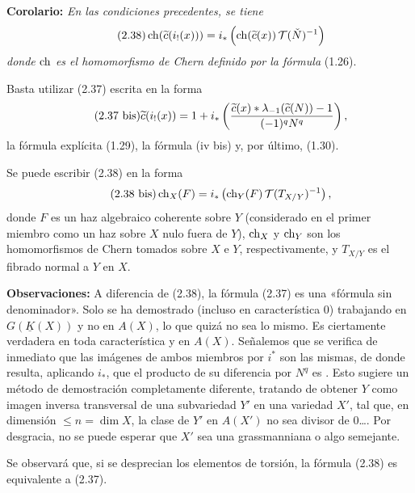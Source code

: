 \textbf{Corolario:} \emph{En las condiciones precedentes, se tiene}
\begin{equation}\tag{2.38}
 \ch(\widetilde c(i_!(x)))=i_*\left(\ch(\widetilde c(x))\,\mathcal T(\check N)^{-1}\right)
\end{equation}
\emph{donde $\ch$ es el homomorfismo de Chern definido por la fórmula} (1.26).

Basta utilizar (2.37) escrita en la forma
\begin{equation}\tag{2.37 bis}
 \widetilde c(i_!(x))=1+i_*\left(\frac{\widetilde c(x)*\lambda_{-1}(\sisi{c(N)}{\widetilde c(N)})-1}{(-1)^qN^q}\right),
\end{equation}
la fórmula explícita (1.29), la fórmula (iv bis) y, por último, (1.30).

Se puede escribir (2.38) en la forma
\begin{equation}\tag{2.38 bis}
 \ch_X(F)=i_*\left(\ch_Y(F)\,\mathcal T(T_{X/Y})^{-1}\right),
\end{equation}
donde $F$ es un haz algebraico coherente sobre $Y$ (considerado en el primer miembro como un haz sobre $X$ nulo fuera de $Y$), $\ch_X$ y $\ch_Y$ son los homomorfismos de Chern tomados sobre $X$ e $Y$, respectivamente, y $T_{X/Y}$ es el fibrado normal a $Y$ en $X$.

\textbf{Observaciones:} A diferencia de (2.38), la fórmula (2.37) es una «fórmula sin denominador». Solo se ha demostrado (incluso en característica $0$) trabajando en $G(\underline K(X))$ y no en $A(X)$, lo que quizá no sea lo mismo. Es ciertamente verdadera en toda característica y en $A(X)$. Señalemos que se verifica de inmediato que las imágenes de ambos miembros por $i^*$ son las mismas, de donde resulta, aplicando $i_*$, que el producto de su diferencia por $N^q$ es . Esto sugiere un método de demostración completamente diferente, tratando de obtener $Y$ como imagen inversa transversal de una subvariedad $Y'$ en una variedad $X'$, tal que, en dimensión $\leq n=\dim X$, la clase de $Y'$ en $A(X')$ no sea divisor de $0$\dots. Por desgracia, no se puede esperar que $X'$ sea una grassmanniana o algo semejante.

Se observará que, si se desprecian los elementos de torsión, la fórmula (2.38) es equivalente a (2.37).




\providecommand{\cS}{\mathcal S}
\providecommand{\cD}{\mathcal D}
\providecommand{\cE}{\mathscr E}
\providecommand{\cG}{\mathscr G}
\providecommand{\cL}{\mathscr L}
\providecommand{\cM}{\mathscr M}
\providecommand{\cP}{\mathscr P}
\providecommand{\cK}{\mathcal K}
\providecommand{\Db}{\mathrm D}
\providecommand{\Kb}{\mathrm K}
\providecommand{\Trc}{\operatorname{Tr}}
\providecommand{\ob}{\operatorname{ob}}
\providecommand{\Coh}{\operatorname{Coh}}
\providecommand{\Cone}{\operatorname{Cone}}
\providecommand{\im}{\operatorname{Im}}
\providecommand{\Id}{\operatorname{Id}}
\providecommand{\RR}{\mathrm{R.R.}}
\providecommand{\RRR}{\mathrm{R.R.R.}}
\providecommand{\GrR}{\mathrm{G}}
\providecommand{\pr}{\operatorname{pr}}
